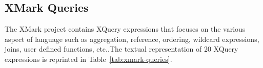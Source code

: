 \subsection{XMark Queries}\label{xmark-queries}
The XMark project contains XQuery expressions that focuses on the various aspect of language such as aggregation, reference, ordering, wildcard expressions, joins, user defined functions, etc.\citep{xmark/mlynkova2008xml}.The textual representation of 20  XQuery expressions is reprinted in  Table~\ref{tab:xmark-queries}. 

